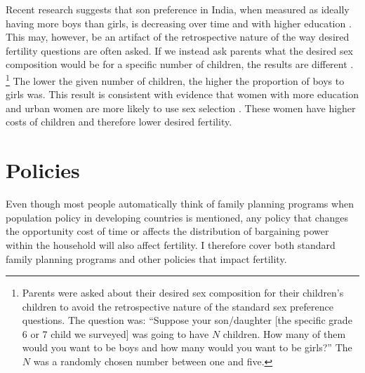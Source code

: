 \documentclass[letterpaper,12pt]{article}
\begin{document}
Recent research suggests that son preference in India, when measured as
ideally having more boys than girls, is decreasing over time and with
higher education \citep{bhat03,pande07}.
This may, however, be an artifact of the retrospective nature of the way
desired fertility questions are often asked.
If we instead ask parents what the desired sex composition would be for
a specific number of children, the results are different 
\citep{Jayachandran2017}.%
\footnote{
Parents were asked about their desired sex composition for their
children's children to avoid the retrospective nature of the 
standard sex preference questions.
The question was:
``Suppose your son/daughter [the specific grade 6 or 7 child we surveyed]
was going to have $N$ children. 
How many of them would you want to be boys
and how many would you want to be girls?''
The $N$ was a randomly chosen number between one and five.
}
The lower the given number of children, the higher the proportion of
boys to girls was.
This result is consistent with evidence that women with more education
and urban women are more likely to use sex selection
\citep{Portner2015b}.
These women have higher costs of children and therefore lower desired
fertility.

\section{Policies}

Even though most people automatically think of family planning programs
when population policy in developing countries is mentioned, any policy
that changes the opportunity cost of time or affects the distribution of
bargaining power within the household will also affect fertility.
I therefore cover both standard family planning programs and other
policies that impact fertility.
\end{document}

